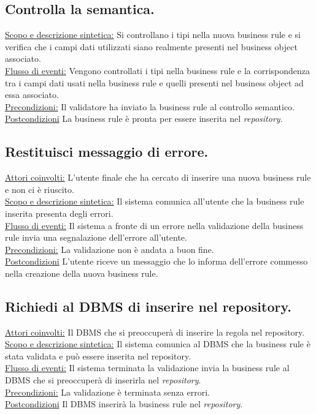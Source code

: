 \documentclass[11pt,titlepage,a4paper]{report}
\begin{document}
\subsection{Controlla la semantica.}
\underline{Scopo e descrizione sintetica:} Si controllano i tipi nella nuova business rule e si verifica che i campi dati utilizzati siano realmente presenti nel business object associato.\\
\underline{Flusso di eventi:} Vengono controllati i tipi nella business rule e la corrispondenza tra i campi dati usati nella business rule e quelli presenti nel business object ad essa associato.\\
\underline{Precondizioni:} Il validatore ha inviato la business rule al controllo semantico.\\
\underline{Postcondizioni} La business rule \`e pronta per essere inserita nel \textit{repository}.

\subsection{Restituisci messaggio di errore.}
\underline{Attori coinvolti:} L'utente finale che ha cercato di inserire una nuova business rule e non ci \`e riuscito.\\
\underline{Scopo e descrizione sintetica:} Il sistema comunica all'utente che la business rule inserita presenta degli errori.\\
\underline{Flusso di eventi:} Il sistema  a fronte di un errore nella validazione della business rule invia una segnalazione dell'errore all'utente.\\
\underline{Precondizioni:} La validazione non \`e andata a buon fine.\\
\underline{Postcondizioni} L'utente riceve un messaggio che lo informa dell'errore commesso nella creazione della nuova business rule.

\subsection{Richiedi al DBMS di inserire nel repository.}
\underline{Attori coinvolti:} Il DBMS che si preoccuper\`a di inserire la regola nel repository.\\
\underline{Scopo e descrizione sintetica:} Il sistema comunica al DBMS che la business rule \`e stata validata e pu\`o essere inserita nel repository.\\
\underline{Flusso di eventi:} Il sistema  terminata la validazione invia la business rule al DBMS che si preoccuper\`a di inserirla nel \textit{repository}.\\
\underline{Precondizioni:} La validazione \`e terminata senza errori.\\
\underline{Postcondizioni} Il DBMS inserir\`a la business rule nel \textit{repository}.
\end{document}
